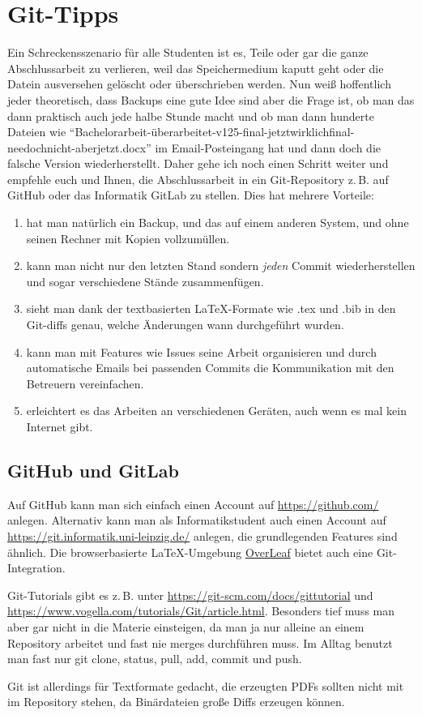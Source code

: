 \chapter{Git-Tipps}
Ein Schreckensszenario für alle Studenten ist es, Teile oder gar die ganze Abschlussarbeit zu verlieren, weil das Speichermedium kaputt geht oder die Datein ausversehen gelöscht oder überschrieben werden.
Nun weiß hoffentlich jeder theoretisch, dass Backups eine gute Idee sind aber die Frage ist, ob man das dann praktisch auch jede halbe Stunde macht und ob man dann hunderte Dateien wie \enquote{Bachelorarbeit-überarbeitet-v125-final-jetztwirklichfinal-needochnicht-aberjetzt.docx} im Email-Posteingang hat und dann doch die falsche Version wiederherstellt.
Daher gehe ich noch einen Schritt weiter und empfehle euch und Ihnen, die Abschlussarbeit in ein Git-Repository z.\,B. auf GitHub oder das Informatik GitLab zu stellen.
Dies hat mehrere Vorteile:

\begin{enumerate}
\item hat man natürlich ein Backup, und das auf einem anderen System, und ohne seinen Rechner mit Kopien vollzumüllen.
\item kann man nicht nur den letzten Stand sondern \emph{jeden} Commit wiederherstellen und sogar verschiedene Stände zusammenfügen.
\item sieht man dank der textbasierten LaTeX-Formate wie .tex und .bib in den Git-diffs genau, welche Änderungen wann durchgeführt wurden.
\item kann man mit Features wie Issues seine Arbeit organisieren und durch automatische Emails bei passenden Commits die Kommunikation mit den Betreuern vereinfachen.
\item erleichtert es das Arbeiten an verschiedenen Geräten, auch wenn es mal kein Internet gibt.
\end{enumerate}

\section{GitHub und GitLab}
Auf GitHub kann man sich einfach einen Account auf \url{https://github.com/} anlegen.
Alternativ kann man als Informatikstudent auch einen Account auf \url{https://git.informatik.uni-leipzig.de/} anlegen, die grundlegenden Features sind ähnlich.
Die browserbasierte LaTeX-Umgebung \href{https://www.overleaf.com/}{OverLeaf} bietet auch eine Git-Integration.

Git-Tutorials gibt es z.\,B. unter \url{https://git-scm.com/docs/gittutorial} und \url{https://www.vogella.com/tutorials/Git/article.html}.
Besonders tief muss man aber gar nicht in die Materie einsteigen, da man ja nur alleine an einem Repository arbeitet und fast nie merges durchführen muss.
Im Alltag benutzt man fast nur git clone, status, pull, add, commit und push.

Git ist allerdings für Textformate gedacht, die erzeugten PDFs sollten nicht mit im Repository stehen, da Binärdateien große Diffs erzeugen können.

